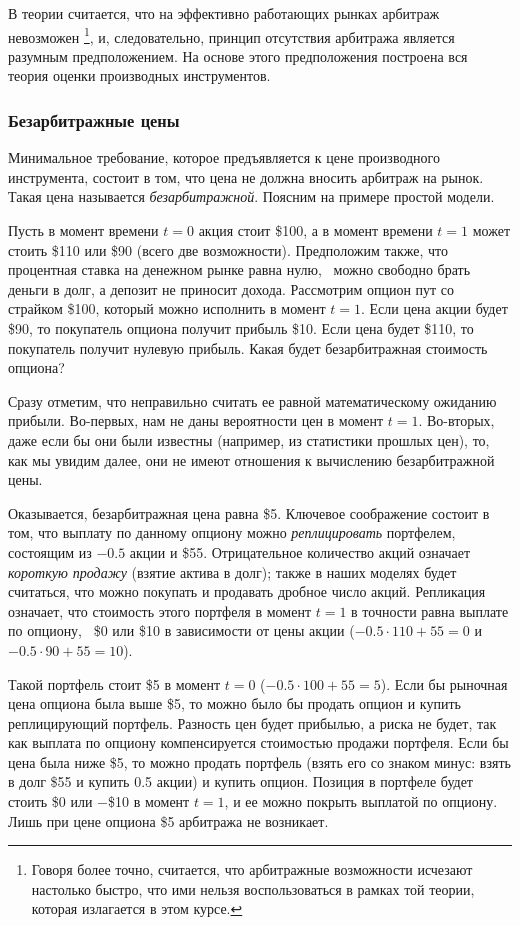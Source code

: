 В теории считается, что на эффективно работающих рынках арбитраж невозможен%
\footnote{Говоря более точно, считается, что арбитражные возможности исчезают настолько быстро, что ими нельзя воспользоваться  в рамках той теории, которая излагается в этом курсе.},
и, следовательно, принцип отсутствия арбитража является разумным предположением.
На основе этого предположения построена вся теория оценки производных инструментов.


\subsubsection{Безарбитражные цены}

Минимальное требование, которое предъявляется к цене производного инструмента, состоит в том, что цена не должна вносить арбитраж на рынок.
Такая цена называется \emph{безарбитражной}.
Поясним на примере простой модели.

\begin{example}
Пусть в момент времени $t=0$ акция стоит \$100, а в момент времени $t=1$ может стоить \$110 или \$90 (всего две возможности).
Предположим также, что процентная ставка на денежном рынке равна нулю, \te\ можно свободно брать деньги в долг, а депозит не приносит дохода.
Рассмотрим опцион пут со страйком \$100, который можно исполнить в момент $t=1$.
Если цена акции будет \$90, то покупатель опциона получит прибыль \$10.
Если цена будет \$110, то покупатель получит нулевую прибыль.
Какая будет безарбитражная стоимость опциона?

Сразу отметим, что неправильно считать ее равной математическому ожиданию прибыли. 
Во-первых, нам не даны вероятности цен в момент $t=1$.
Во-вторых, даже если бы они были известны (например, из статистики прошлых цен), то, как мы увидим далее, они не имеют отношения к вычислению безарбитражной цены.

Оказывается, безарбитражная цена равна \$5.
Ключевое соображение состоит в том, что выплату по данному опциону можно \emph{реплицировать} портфелем, состоящим из $-0.5$ акции и \$55.
Отрицательное количество акций означает \emph{короткую продажу} (взятие актива в долг); также в наших моделях будет считаться, что можно покупать и продавать дробное число акций.
Репликация означает, что стоимость этого портфеля в момент $t=1$ в точности равна выплате по опциону, \te\ \$0 или \$10 в зависимости от цены акции ($-0.5 \cdot 110 + 55 =0$ и $-0.5 \cdot 90 + 55 = 10$).

Такой портфель стоит \$5 в момент $t=0$ ($-0.5 \cdot 100 + 55 = 5$).
Если бы рыночная цена опциона была выше \$5, то можно было бы продать опцион и купить реплицирующий портфель.
Разность цен будет прибылью, а риска не будет, так как выплата по опциону компенсируется стоимостью продажи портфеля.
Если бы цена была ниже \$5, то можно продать портфель (взять его со знаком минус: взять в долг \$55 и купить 0.5 акции) и купить опцион.
Позиция в портфеле будет стоить \$0 или $-$\$10 в момент $t=1$, и ее можно покрыть выплатой по опциону.
Лишь при цене опциона \$5 арбитража не возникает. 
\end{example}


